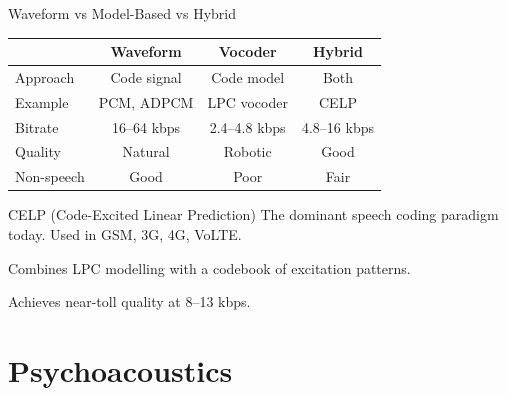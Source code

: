 \documentclass[aspectratio=169,12pt]{beamer}
\begin{document}
\begin{frame}{Waveform vs Model-Based vs Hybrid}
    \begin{center}
        \begin{tabular}{l|c|c|c}
            \toprule
            & \textbf{Waveform} & \textbf{Vocoder} & \textbf{Hybrid} \\
            \midrule
            Approach & Code signal & Code model & Both \\
            Example & PCM, ADPCM & LPC vocoder & CELP \\
            Bitrate & 16--64 kbps & 2.4--4.8 kbps & 4.8--16 kbps \\
            Quality & Natural & Robotic & Good \\
            Non-speech & Good & Poor & Fair \\
            \bottomrule
        \end{tabular}
    \end{center}
    
    \vspace{0.3cm}
    \begin{block}{CELP (Code-Excited Linear Prediction)}
        The dominant speech coding paradigm today. Used in GSM, 3G, 4G, VoLTE.
        
        Combines LPC modelling with a codebook of excitation patterns.
        
        Achieves near-toll quality at 8--13 kbps.
    \end{block}
\end{frame}

\section{Psychoacoustics}
\end{document}
